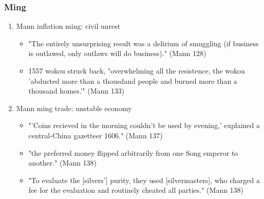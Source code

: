 \documentclass[letterpaper]{article}
\begin{document}
\subsubsection{Ming}
\label{sec:orgcc3dc6c}
\begin{enumerate}
\item Mann inflation ming: civil unrest
\label{sec:orgb0a7ba8}
\begin{itemize}
\item "The entirely unsurprising result was a delirium of smuggling (if business is outlawed, only outlaws will do business)." (Mann 128)
\item 1557 wokou struck back, "overwhelming all the resistence, the wokou 'abducted more than a thousdand people and burned more than a thousand homes.'" (Mann 133)
\end{itemize}

\item Mann ming trade: unstable economy
\label{sec:org29d37c7}
\begin{itemize}
\item "'Coins recieved in the morning couldn't be used by evening,' explained a central-China gazetteer 1606." (Mann 137)
\item "the preferred money flipped arbitrarily from one Song emperor to another." (Mann 138)
\item "To evaluate the [silvers'] purity, they used [silvermasters], who charged a fee for the evaluation and routinely cheated all parties." (Mann 138)
\end{itemize}
\end{enumerate}
\end{document}

